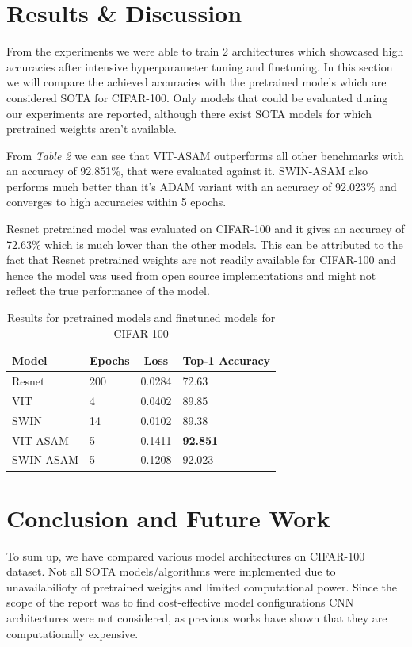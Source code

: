 \documentclass{article}
\begin{document}
\section{Results \& Discussion}
From the experiments we were able to train 2 architectures which showcased high accuracies after intensive hyperparameter tuning and finetuning. 
In this section we will compare the achieved accuracies with the pretrained models which are considered SOTA for CIFAR-100. 
Only models that could be evaluated during our experiments are reported, although there exist SOTA models for which pretrained weights aren't available.

From \textit{Table 2} we can see that VIT-ASAM outperforms all other benchmarks with an accuracy of 92.851\%, that were evaluated against it. 
SWIN-ASAM also performs much better than it's ADAM variant with an accuracy of 92.023\% and converges to high accuracies within 5 epochs.

Resnet pretrained model was evaluated on CIFAR-100 and it gives an accuracy of 72.63\% which is much lower than the other models.
This can be attributed to the fact that Resnet pretrained weights are not readily available for CIFAR-100 and hence the model was used from open source implementations and might not reflect the true performance of the model.

\begin{table}[ht]
    \begin{tabular}{|l|l|c|l|}
        \hline
        \textbf{Model} & \textbf{Epochs} & \textbf{Loss} & \textbf{Top-1 Accuracy} \\ \hline
        Resnet         & 200             & 0.0284        & 72.63                   \\ \hline
        VIT            & 4               & 0.0402        & 89.85                   \\ \hline
        SWIN           & 14              & 0.0102        & 89.38                   \\ \hline
        VIT-ASAM       & 5               & 0.1411        & \textbf{92.851}         \\ \hline
        SWIN-ASAM      & 5               & 0.1208        & 92.023                  \\ \hline
    \end{tabular}
    \caption{Results for pretrained models and finetuned models for CIFAR-100}
\end{table}


\section{Conclusion and Future Work}
To sum up, we have compared various model architectures on CIFAR-100 dataset.
Not all SOTA models/algorithms were implemented due to unavailabilioty of pretrained weigjts and limited computational power. 
Since the scope of the report was to find cost-effective model configurations CNN architectures were not considered, as previous works have shown that they are computationally expensive.
\end{document}
